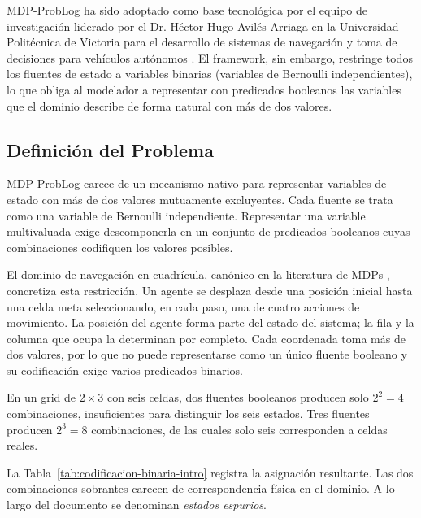 MDP-ProbLog ha sido adoptado como base tecnológica por el equipo de
investigación liderado por el Dr. Héctor Hugo Avilés-Arriaga en la
Universidad Politécnica de Victoria para el desarrollo de sistemas de
navegación y toma de decisiones para vehículos autónomos
\cite{Avilés31122024}. El framework, sin embargo, restringe todos los
fluentes de estado a variables binarias (variables de Bernoulli
independientes), lo que obliga al modelador a representar con predicados
booleanos las variables que el dominio describe de forma natural con más
de dos valores.

\subsection{Definición del Problema}
\label{sec:problema}

MDP-ProbLog carece de un mecanismo nativo para representar variables de
estado con más de dos valores mutuamente excluyentes. Cada fluente se
trata como una variable de Bernoulli independiente. Representar una
variable multivaluada exige descomponerla en un conjunto de predicados
booleanos cuyas combinaciones codifiquen los valores posibles.

El dominio de navegación en cuadrícula, canónico en la literatura de
MDPs \cite{mitchell1997machine, sutton2018reinforcement}, concretiza
esta restricción. Un agente se desplaza desde una posición inicial hasta
una celda meta seleccionando, en cada paso, una de cuatro acciones de
movimiento. La posición del agente forma parte del estado del sistema;
la fila y la columna que ocupa la determinan por completo. Cada
coordenada toma más de dos valores, por lo que no puede representarse
como un único fluente booleano y su codificación exige varios predicados
binarios.

En un grid de $2 \times 3$ con seis celdas, dos fluentes booleanos
producen solo $2^2 = 4$ combinaciones, insuficientes para distinguir
los seis estados. Tres fluentes producen $2^3 = 8$ combinaciones, de
las cuales solo seis corresponden a celdas reales.

La Tabla~\ref{tab:codificacion-binaria-intro} registra la asignación
resultante. Las dos combinaciones sobrantes carecen de correspondencia
física en el dominio. A lo largo del documento se denominan
\textit{estados espurios}.

